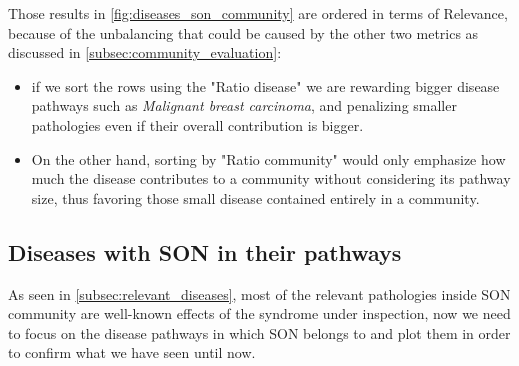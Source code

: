 Those results in \autoref{fig:diseases_son_community} are ordered in terms of Relevance, because of the unbalancing that could be caused by the other two metrics as discussed in \autoref{subsec:community_evaluation}: 
\begin{itemize}
    \item if we sort the rows using the "Ratio disease" we are rewarding bigger disease pathways such as \textit{Malignant breast carcinoma}, and penalizing smaller pathologies even if their overall contribution is bigger.
    \item On the other hand, sorting by "Ratio community" would only emphasize how much the disease contributes to a community without considering its pathway size, thus favoring those small disease contained entirely in a community.
\end{itemize}
 
\subsection{Diseases with SON in their pathways}\label{subsec:diseases_son}
As seen in \autoref{subsec:relevant_diseases}, most of the relevant pathologies inside SON community are well-known effects of the syndrome under inspection, now we need to focus on the disease pathways in which SON belongs to and plot them in order to confirm what we have seen until now.
\vspace{3mm}

